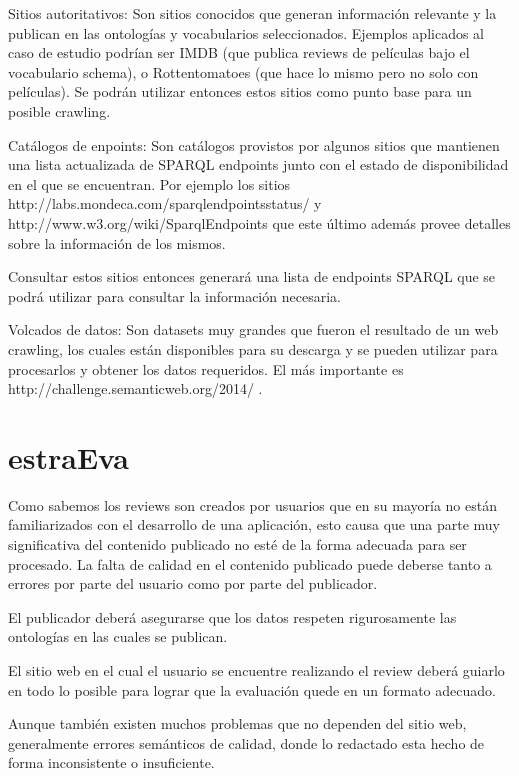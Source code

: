Sitios autoritativos: Son sitios conocidos que generan información relevante y la publican en las ontologías y vocabularios 
seleccionados. Ejemplos aplicados al caso de estudio podrían ser IMDB (que publica reviews de películas bajo el vocabulario schema), o Rottentomatoes
(que hace lo mismo pero no solo con películas). Se podrán utilizar entonces estos sitios como punto base para un posible crawling.

Catálogos de enpoints: Son catálogos provistos por algunos sitios que mantienen una lista actualizada de SPARQL endpoints 
junto con el estado de disponibilidad en el que se encuentran. Por ejemplo los sitios http://labs.mondeca.com/sparqlendpointsstatus/ y 
http://www.w3.org/wiki/SparqlEndpoints que este último además provee detalles sobre la información de los mismos.

Consultar estos sitios entonces generará una lista de endpoints SPARQL que se podrá utilizar para consultar la información necesaria.

Volcados de datos: Son datasets muy grandes que fueron el resultado de un web crawling, los cuales están disponibles para su descarga 
y se pueden utilizar para procesarlos y obtener los datos requeridos. El más importante es http://challenge.semanticweb.org/2014/ .

%

 

\section{estraEva} 
Como sabemos los reviews son creados por usuarios que en su mayoría no están familiarizados con el desarrollo de una 
aplicación, esto causa que una parte muy significativa del contenido publicado no esté de la forma adecuada para ser procesado. 
La falta de calidad en el contenido publicado puede deberse tanto a errores por parte del usuario como por parte del publicador.


El publicador deberá asegurarse que los datos respeten rigurosamente las ontologías en las cuales se publican.

El sitio web en el cual el usuario se encuentre realizando el review deberá guiarlo en todo lo posible para lograr que la evaluación
quede en un formato adecuado.


Aunque también existen muchos problemas que no dependen del sitio web, generalmente errores semánticos de calidad, donde lo 
redactado esta hecho de forma inconsistente o insuficiente.


